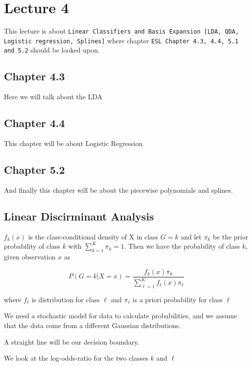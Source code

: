 \chapter{Lecture 4}

This lecture is about \texttt{Linear Classifiers and Basis Expansion
[LDA, QDA, Logistic regression, Splines]} where chapter \texttt{ESL Chapter 4.3, 4.4, 5.1
and 5.2} should be looked upon.

\cite{lecture4}

\section{Chapter 4.3}

Here we will talk about the LDA

\section{Chapter 4.4}

This chapter will be about Logistic Regression

\section{Chapter 5.2}

And finally this chapter will be about the piecewise polynomials and splines.

\section{Linear Discirminant Analysis}

$f_k(x)$ is the class-conditional density of X in class $G = k$ and let $\pi_k$ be the prior probability of class $k$ with $\sum_{k=1}^{K}  \pi_k = 1$. Then we have the probability of class $k$, given observation $x$ as

\[
    P(G = k | X = x) = \frac{f_k (x) \pi_k}{\sum_{\ell = 1}^{K} f_\ell (x) \pi_\ell}
\]

where $f_\ell$ is distribution for class $\ell$ and $\pi_\ell$ is a priori probability for class $\ell$

We need a stochastic model for data to calculate probabilities, and we assume that the data come from a different Gaussian distributions.

A straight line will be our decision boundary.

We look at the log-odds-ratio for the two classes $k$ and $\ell$

